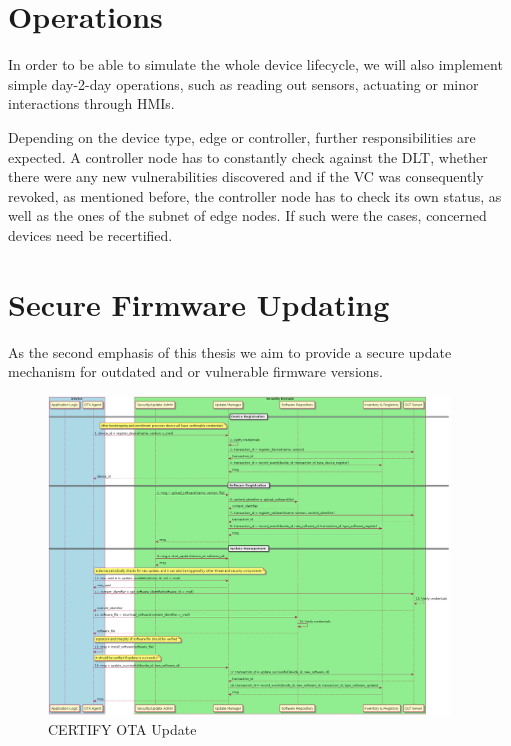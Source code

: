 

\section{Operations} %
\label{sec:Operations}

In order to be able to simulate the whole device lifecycle, we will also implement simple day-2-day operations, such as
reading out sensors, actuating or minor interactions through HMIs.

Depending on the device type, edge or controller, further responsibilities are expected. A controller node has to
constantly check against the DLT, whether there were any new vulnerabilities discovered and if the VC was consequently
revoked, as mentioned before, the controller node has to check its own status, as well as the ones of the subnet of
edge nodes. If such were the cases, concerned devices need be recertified.




\section{Secure Firmware Updating} %
\label{sec:Secure Firmware Updating}

As the second emphasis of this thesis we aim to provide a secure update mechanism for outdated and or vulnerable
firmware versions.

\begin{figure}
	\begin{center}
		\includegraphics[width=0.95\textwidth]{figures/ota-update-certify-V1.2.png}
	\end{center}
	\caption{CERTIFY OTA Update \cite{certifyproject2023}}
	\label{fig:ota-update-certify}
\end{figure}


